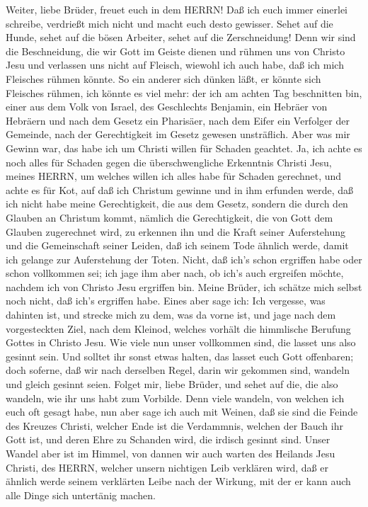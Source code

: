  Weiter, liebe Brüder, freuet euch in dem HERRN! Daß ich
euch immer einerlei schreibe, verdrießt mich nicht und macht euch desto
gewisser.  Sehet auf die Hunde, sehet auf die bösen
Arbeiter, sehet auf die Zerschneidung!  Denn wir sind die
Beschneidung, die wir Gott im Geiste dienen und rühmen uns von Christo
Jesu und verlassen uns nicht auf Fleisch,  wiewohl ich auch
habe, daß ich mich Fleisches rühmen könnte. So ein anderer sich dünken
läßt, er könnte sich Fleisches rühmen, ich könnte es viel mehr:
 der ich am achten Tag beschnitten bin, einer aus dem Volk
von Israel, des Geschlechts Benjamin, ein Hebräer von Hebräern und nach
dem Gesetz ein Pharisäer,  nach dem Eifer ein Verfolger der
Gemeinde, nach der Gerechtigkeit im Gesetz gewesen unsträflich.
 Aber was mir Gewinn war, das habe ich um Christi willen für
Schaden geachtet.  Ja, ich achte es noch alles für Schaden
gegen die überschwengliche Erkenntnis Christi Jesu, meines HERRN, um
welches willen ich alles habe für Schaden gerechnet, und achte es für
Kot, auf daß ich Christum gewinne  und in ihm erfunden
werde, daß ich nicht habe meine Gerechtigkeit, die aus dem Gesetz,
sondern die durch den Glauben an Christum kommt, nämlich die
Gerechtigkeit, die von Gott dem Glauben zugerechnet wird, 
zu erkennen ihn und die Kraft seiner Auferstehung und die Gemeinschaft
seiner Leiden, daß ich seinem Tode ähnlich werde,  damit
ich gelange zur Auferstehung der Toten.  Nicht, daß ich's
schon ergriffen habe oder schon vollkommen sei; ich jage ihm aber nach,
ob ich's auch ergreifen möchte, nachdem ich von Christo Jesu ergriffen
bin.  Meine Brüder, ich schätze mich selbst noch nicht, daß
ich's ergriffen habe. Eines aber sage ich: Ich vergesse, was dahinten
ist, und strecke mich zu dem, was da vorne ist,  und jage
nach dem vorgesteckten Ziel, nach dem Kleinod, welches vorhält die
himmlische Berufung Gottes in Christo Jesu.  Wie viele nun
unser vollkommen sind, die lasset uns also gesinnt sein. Und solltet ihr
sonst etwas halten, das lasset euch Gott offenbaren;  doch
soferne, daß wir nach derselben Regel, darin wir gekommen sind, wandeln
und gleich gesinnt seien.  Folget mir, liebe Brüder, und
sehet auf die, die also wandeln, wie ihr uns habt zum Vorbilde.
 Denn viele wandeln, von welchen ich euch oft gesagt habe,
nun aber sage ich auch mit Weinen, daß sie sind die Feinde des Kreuzes
Christi,  welcher Ende ist die Verdammnis, welchen der
Bauch ihr Gott ist, und deren Ehre zu Schanden wird, die irdisch gesinnt
sind.  Unser Wandel aber ist im Himmel, von dannen wir auch
warten des Heilands Jesu Christi, des HERRN,  welcher
unsern nichtigen Leib verklären wird, daß er ähnlich werde seinem
verklärten Leibe nach der Wirkung, mit der er kann auch alle Dinge sich
untertänig machen.

